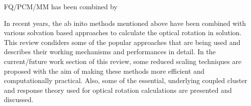 FQ/PCM/MM has been combined by

In recent years, the ab inito methods
mentioned above have been combined with various solvation based
approaches\cite{Neugebauer05,Neugebauer09,Mennucci02,Tomasi05,JensenGordon96}
to calculate the optical rotation in solution. This review condiders some of
the popular approaches that are being used and describes their working
mechanisms and performances in detail. In the current/future work section of
this review, some reduced scaling techniques are proposed with the aim of
making these methods more efficient and computationally practical. Also, some
of the essential, underlying coupled cluster and response theory used for
optical rotation calculations are presented and discussed.

